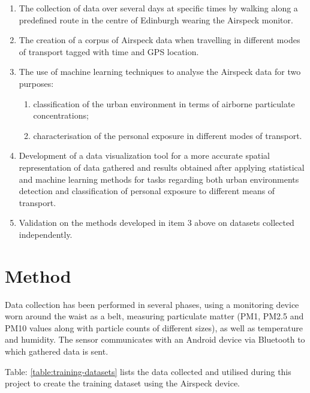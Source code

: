 \documentclass[bsc,frontabs,twoside,singlespacing, parskip,deptreport]{infthesis}     %
\begin{document}
\begin{enumerate}
\item The collection of data over several days at specific times by walking along a predefined route in the centre of Edinburgh wearing the Airspeck monitor.

\item The creation of a corpus of Airspeck data when travelling in different modes of transport tagged with time and GPS location.

\item The use of machine learning techniques to analyse the Airspeck data for two purposes:

\begin{enumerate} 
\item classification of the urban environment in terms of airborne particulate concentrations;
\item characterisation of the personal exposure in different  modes of transport.
\end{enumerate}

\item Development of a data visualization tool for a more accurate spatial representation of data gathered and results obtained after applying statistical and machine learning methods for tasks regarding both urban environments detection and classification of personal exposure to different means of transport.

\item Validation on the methods developed in item 3 above on datasets collected independently.
\end{enumerate}

\section{Method}

Data collection has been performed in several phases, using a monitoring device worn around the waist as a belt, measuring particulate matter (PM1, PM2.5 and PM10 values along with particle counts of different sizes), as well as temperature and humidity. The sensor communicates with an Android device via Bluetooth to which gathered data is sent.

Table: \ref{table:training-datasets} lists the data collected and utilised during this project to create the training dataset using the Airspeck device.
\end{document}
